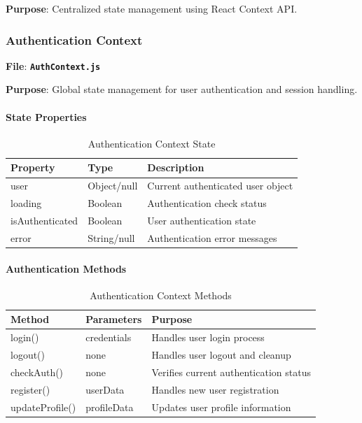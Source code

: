 \documentclass[12pt,a4paper]{article}
\newcommand{\file}[1]{\textbf{\texttt{#1}}}
\begin{document}
\textbf{Purpose}: Centralized state management using React Context API.

\subsubsection{Authentication Context}
\label{subsubsec:auth-context}

\textbf{File}: \file{AuthContext.js}

\textbf{Purpose}: Global state management for user authentication and session handling.

\paragraph{State Properties}
\begin{table}[H]
\centering
\small
\begin{tabular}{@{}lll@{}}
\toprule
\textbf{Property} & \textbf{Type} & \textbf{Description} \\
\midrule
user & Object/null & Current authenticated user object \\
loading & Boolean & Authentication check status \\
isAuthenticated & Boolean & User authentication state \\
error & String/null & Authentication error messages \\
\bottomrule
\end{tabular}
\caption{Authentication Context State}
\label{tab:auth-context-state}
\end{table}

\paragraph{Authentication Methods}
\begin{table}[H]
\centering
\small
\begin{tabular}{@{}lll@{}}
\toprule
\textbf{Method} & \textbf{Parameters} & \textbf{Purpose} \\
\midrule
login() & credentials & Handles user login process \\
logout() & none & Handles user logout and cleanup \\
checkAuth() & none & Verifies current authentication status \\
register() & userData & Handles new user registration \\
updateProfile() & profileData & Updates user profile information \\
\bottomrule
\end{tabular}
\caption{Authentication Context Methods}
\label{tab:auth-context-methods}
\end{table}
\end{document}
